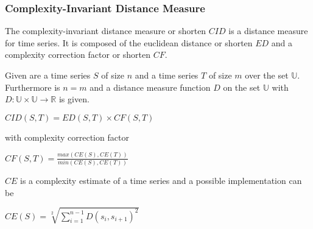 \subsubsection{Complexity-Invariant Distance Measure}
The complexity-invariant distance measure \cite{batista2011complexity} or shorten $CID$ is a distance measure for time
series. It is composed of the euclidean distance or shorten $ED$ and a complexity correction factor or shorten $CF$.

Given are a time series $S$ of size $n$ and a time series $T$ of size $m$ over the set $\mathbb{U}$. Furthermore is
$n = m$ and a distance measure function $D$ on the set $\mathbb{U}$ with
$D: \mathbb{U} \times \mathbb{U} \to \mathbb{R}$ is given.
\begin{center}
    $CID(S, T) = ED(S, T) \times CF(S, T)$
\end{center}
with complexity correction factor
\begin{center}
    $CF(S, T) = \frac{max(CE(S), CE(T))}{min(CE(S), CE(T))}$
\end{center}
$CE$ is a complexity estimate of a time series and a possible implementation can be
\begin{center}
    $CE(S) = \sqrt[2]{\sum \limits_{i=1}^{n-1} D(s_i, s_{i + 1})^2}$
\end{center}
